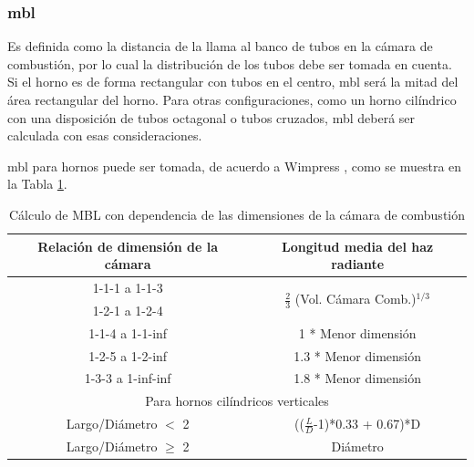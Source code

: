 \subsubsection{\ac{mbl}}
\par Es definida como la distancia de la llama al banco de tubos en la cámara de combustión, por lo cual la distribución de los tubos debe ser tomada en cuenta. Si el horno es de forma rectangular con tubos en el centro, \ac{mbl} será la mitad del área rectangular del horno. Para otras configuraciones, como un horno cilíndrico con una disposición de tubos octagonal o tubos cruzados, \ac{mbl} deberá ser calculada con esas consideraciones.
\par \ac{mbl} para hornos puede ser tomada, de acuerdo a Wimpress \cite{bib:wimpress}, como se muestra en la Tabla \ref{tbl:mbl}.
\begin{table}[H]
\caption[Cálculo de MBL]{Cálculo de MBL con dependencia de las dimensiones de la cámara de combustión}
\label{tbl:mbl}
\centering
\begin{tabular}{c|c}
    Relación de dimensión de la cámara  & Longitud media del haz radiante \\
    \hline
    1-1-1 a 1-1-3   & \multirow{2}{12em}{$\frac{2}{3}$ (Vol. Cámara Comb.)$^{1/3}$} \\
    1-2-1 a 1-2-4   & \\
    \hline
    1-1-4 a 1-1-inf & 1 * Menor dimensión \\
    \hline
    1-2-5 a 1-2-inf   & 1.3 * Menor dimensión \\
    \hline
    1-3-3 a 1-inf-inf & 1.8 * Menor dimensión \\
    \hline
    \multicolumn{2}{c}{Para hornos cilíndricos verticales} \\
    \hline
    Largo/Diámetro $<$ 2  & (($\frac{L}{D}$-1)*0.33 + 0.67)*D\\
    \hline
    Largo/Diámetro $\geq$ 2 & Diámetro\\
\end{tabular}
\end{table}

